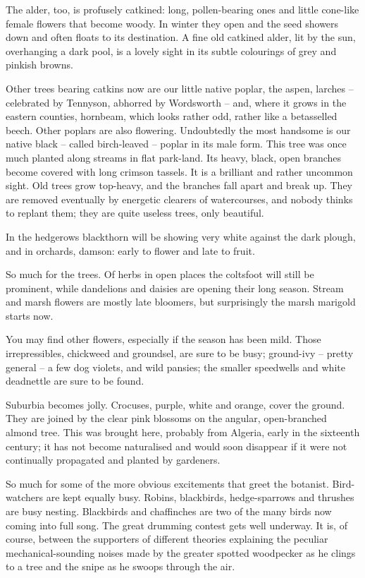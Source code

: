 The alder, too, is profusely catkined: long, pollen-bearing ones and little cone-like female flowers that become woody. In winter they open and the seed showers down and often floats to its destination. A fine old catkined alder, lit by the sun, overhanging a dark pool, is a lovely sight in its subtle colourings of grey and pinkish browns.

Other trees bearing catkins now are our little native poplar, the aspen, larches -- celebrated by Tennyson, abhorred by Wordsworth -- and, where it grows in the eastern counties, hornbeam, which looks rather odd, rather like a betasselled beech. Other poplars are also flowering. Undoubtedly the most handsome is our native black -- called birch-leaved -- poplar in its male form. This tree was once much planted along streams in flat park-land. Its heavy, black, open branches become covered with long crimson tassels. It is a brilliant and rather uncommon sight. Old trees grow top-heavy, and the branches fall apart and break up. They are removed eventually by energetic clearers of watercourses, and nobody thinks to replant them; they are quite useless trees, only beautiful.

In the hedgerows blackthorn will be showing very white against the dark plough, and in orchards, damson: early to flower and late to fruit.

So much for the trees. Of herbs in open places the coltsfoot will still be prominent, while dandelions and daisies are opening their long season. Stream and marsh flowers are mostly late bloomers, but surprisingly the marsh marigold starts now.

You may find other flowers, especially if the season has been mild. Those irrepressibles, chickweed and groundsel, are sure to be busy; ground-ivy -- pretty general -- a few dog violets, and wild pansies; the smaller speedwells and white deadnettle are sure to be found.

Suburbia becomes jolly. Crocuses, purple, white and orange, cover the ground. They are joined by the clear pink blossoms on the angular, open-branched almond tree. This was brought here, probably from Algeria, early in the sixteenth century; it has not become naturalised and would soon disappear if it were not continually propagated and planted by gardeners.

So much for some of the more obvious excitements that greet the botanist. Bird-watchers are kept equally busy. Robins, blackbirds, hedge-sparrows and thrushes are busy nesting. Blackbirds and chaffinches are two of the many birds now coming into full song. The great drumming contest gets well underway. It is, of course, between the supporters of different theories explaining the peculiar mechanical-sounding noises made by the greater spotted woodpecker as he clings to a tree and the snipe as he swoops through the air.

